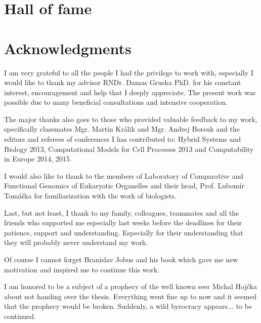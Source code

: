 \ifdefined\godzilla
  \chapter*{Hall of fame}
\else
  \chapter*{Acknowledgments}
\fi

I am very grateful to all the people I had the privilege to work with, especially I would like to thank my advisor RNDr. Damas Gruska PhD. for his constant interest, encouragement and help that I deeply appreciate.
The present work was possible due to many beneficial consultations and intensive cooperation.

The major thanks also goes to those who provided valuable feedback to my work, specifically classmates Mgr. Martin Králik and Mgr. Andrej Borsuk and the editors and referees of conferences I has contributed to: Hybrid Systems and Biology 2013, Computational Models for Cell Processes 2013 and Computability in Europe 2014, 2015.

I would also like to thank to the members of Laboratory of Comparative and Functional Genomics of Eukaryotic Organelles and their head, Prof. Ľubomír Tomáška for familiarization with the work of biologists.

Last, but not least, I thank to my family, colleagues, teammates and all the friends who supported me especially last weeks before the deadlines for their patience, support and understanding.
\ifdefined\godzilla
  Especially for their understanding that they will probably never understand my work.

  Of course I cannot forget Branislav Jobus and his book \cite{Jobus10Ancijas} which gave me new motivation and inspired me to continue this work.

  I am honored to be a subject of a prophecy of the well known seer Michal Hojčka about not handing over the thesis. Everything went fine up to now and it seemed that the prophecy would be broken. Suddenly, a wild byrocracy appears... to be continued.  
\fi
